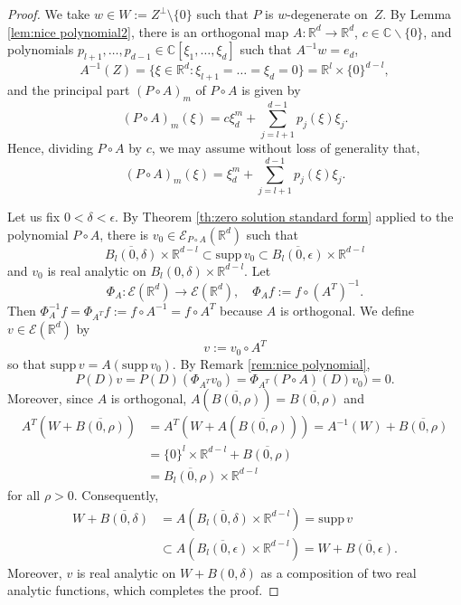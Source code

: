 \documentclass[a4paper,10pt]{amsart}
\newtheorem*{crucial lemma}{Lemma \ref{lem:nice polynomial2}}
\theoremstyle{definition}
\newcommand{\R}{\mathbb{R}}
\newcommand{\C}{\mathbb{C}}
\newcommand{\supp}{\mbox{supp}\,}
\newcommand{\wniceon}[2]{$#1$-degenerate on~#2}
\begin{document}
\begin{proof}
We take $w\in W:=Z^\perp\setminus\{0\}$ such that $P$ is \wniceon{w}{$Z$}. By Lemma \ref{lem:nice polynomial2}, 
there is an orthogonal map $A:\R^d\rightarrow\R^d$, $c\in\C\backslash\{0\}$, and polynomials $p_{l+1},\ldots,p_{d-1}\in\C[\xi_1,\ldots,\xi_d]$ such that $A^{-1}w=e_d$,
	\[A^{-1}(Z)=\{\xi\in\R^d\colon \xi_{l+1}=\ldots=\xi_d=0\}=\R^l\times\{0\}^{d-l},\]
    and the principal part $(P\circ A)_m$ of $P\circ A$ is given by
	\[(P\circ A)_m(\xi)=c\xi_d^m + \sum_{j=l+1}^{d-1}p_j(\xi)\xi_j.\]
Hence, dividing $P\circ A$ by $c$, we may assume without loss of generality that,
\[(P\circ A)_m(\xi)=\xi_d^m + \sum_{j=l+1}^{d-1}p_j(\xi)\xi_j.\]

Let us fix $0<\delta<\epsilon$. By Theorem \ref{th:zero solution standard form} applied to the polynomial $P\circ A$, there is $v_0\in\mathscr{E}_{P\circ A}(\R^d)$ such that 
\[\overline{B_{l}(0,\delta)}\times\R^{d-l}\subset\supp v_0\subset \overline{B_{l}(0,\epsilon)}\times\R^{d-l}\]
and $v_0$ is real analytic on $B_{l}(0,\delta)\times\R^{d-l}$.	
Let 
\[\Phi_A\colon \mathscr{E}(\R^d)\to \mathscr{E}(\R^d),\quad \Phi_Af:=f\circ (A^T)^{-1}.\] Then $\Phi_A^{-1}f=\Phi_{A^T}f:=f\circ A^{-1}=f\circ A^T$ because $A$ is orthogonal. We define $v\in \mathscr{E}(\R^d)$ by
\[v:=v_0\circ A^T\]
so that $\supp v=A\left(\supp v_0\right)$. By Remark \ref{rem:nice polynomial},
\[P(D)v=P(D)(\Phi_{A^T}v_0)=\Phi_{A^T}(P\circ A)(D)v_0)=0.\]
Moreover, since $A$ is orthogonal, $A(\overline{B(0,\rho)})=\overline{B(0,\rho)}$ and 
\begin{align*}
A^T\left(W+\overline{B(0,\rho)}\right)&=
A^T\left(W+A(\overline{B(0,\rho)})\right)
=A^{-1}(W)+\overline{B(0,\rho)}\\
&=\{0\}^l\times\R^{d-l}+\overline{B(0,\rho)}\\
&=\overline{B_l(0,\rho)}\times \R^{d-l}
\end{align*}    
for all $\rho>0$. Consequently,
\begin{align*}
W+\overline{B(0,\delta)}&=A\left(\overline{B_l(0,\delta)}\times \R^{d-l}\right)=\supp v\\
&\subset A\left(\overline{B_l(0,\epsilon)}\times \R^{d-l}\right)=W+\overline{B(0,\epsilon)}.
\end{align*}
Moreover, $v$ is real analytic on $W+B(0,\delta)$ as a composition of two real analytic functions, which completes the proof.
\end{proof}
\end{document}
